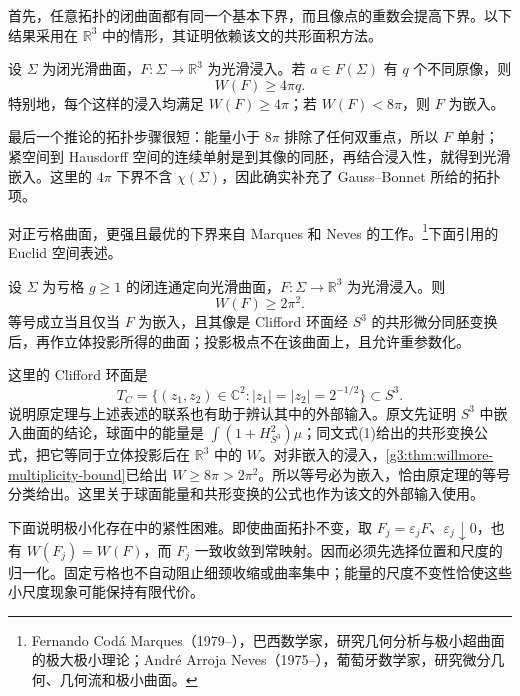 \ProseParagraphBreak

首先，任意拓扑的闭曲面都有同一个基本下界，而且像点的重数会提高下界。以下结果采用\cite[定理6，第286页]{LiYau1982ConformalInvariant}在 \(\mathbb R^3\) 中的情形，其证明依赖该文的共形面积方法。

\begin{theorem}\label{g3:thm:willmore-multiplicity-bound}
	设 \(\Sigma\) 为闭光滑曲面，\(F:\Sigma\to\mathbb R^3\) 为光滑浸入。若 \(a\in F(\Sigma)\) 有 \(q\) 个不同原像，则
	\[
		W(F)\ge4\pi q.
	\]
	特别地，每个这样的浸入均满足 \(W(F)\ge4\pi\)；若 \(W(F)<8\pi\)，则 \(F\) 为嵌入。
\end{theorem}

最后一个推论的拓扑步骤很短：能量小于 \(8\pi\) 排除了任何双重点，所以 \(F\) 单射；紧空间到 Hausdorff 空间的连续单射是到其像的同胚，再结合浸入性，就得到光滑嵌入。这里的 \(4\pi\) 下界不含 \(\chi(\Sigma)\)，因此确实补充了 Gauss--Bonnet 所给的拓扑项。

\ProseParagraphBreak

对正亏格曲面，更强且最优的下界来自 Marques 和 Neves 的工作。\footnote{Fernando Codá Marques（1979--），巴西数学家，研究几何分析与极小超曲面的极大极小理论；André Arroja Neves（1975--），葡萄牙数学家，研究微分几何、几何流和极小曲面。}下面引用\cite[定理A，第685页；式(1)，第684页]{MarquesNeves2014Willmore}的 Euclid 空间表述。

\begin{theorem}\label{g3:thm:willmore-positive-genus-bound}
	设 \(\Sigma\) 为亏格 \(g\ge1\) 的闭连通定向光滑曲面，\(F:\Sigma\to\mathbb R^3\) 为光滑浸入。则
	\[
		W(F)\ge2\pi^2.
	\]
	等号成立当且仅当 \(F\) 为嵌入，且其像是 Clifford 环面经 \(S^3\) 的共形微分同胚变换后，再作立体投影所得的曲面；投影极点不在该曲面上，且允许重参数化。
\end{theorem}

这里的 Clifford 环面是
\[
	T_C=\{(z_1,z_2)\in\mathbb C^2:|z_1|=|z_2|=2^{-1/2}\}\subset S^3.
\]
说明原定理与上述表述的联系也有助于辨认其中的外部输入。原文先证明 \(S^3\) 中嵌入曲面的结论，球面中的能量是 \(\int(1+H_{S^3}^2)\mu\)；同文式(1)给出的共形变换公式，把它等同于立体投影后在 \(\mathbb R^3\) 中的 \(W\)。对非嵌入的浸入，\cref{g3:thm:willmore-multiplicity-bound}已给出 \(W\ge8\pi>2\pi^2\)。所以等号必为嵌入，恰由原定理的等号分类给出。这里关于球面能量和共形变换的公式也作为该文的外部输入使用。

\ProseParagraphBreak

下面说明极小化存在中的紧性困难。即使曲面拓扑不变，取 \(F_j=\varepsilon_jF\)、\(\varepsilon_j\downarrow0\)，也有 \(W(F_j)=W(F)\)，而 \(F_j\) 一致收敛到常映射。因而必须先选择位置和尺度的归一化。固定亏格也不自动阻止细颈收缩或曲率集中；能量的尺度不变性恰使这些小尺度现象可能保持有限代价。

